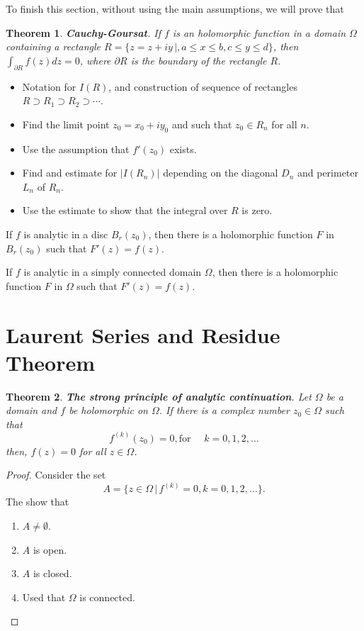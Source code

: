 \documentclass{amsart}
\newtheorem{thm}{Theorem}
\begin{document}
To finish this section, without using the main assumptions, we will prove that 

\begin{thm}
\textbf{Cauchy-Goursat}. If \(f\) is an holomorphic function in a domain \(\Omega\) containing a rectangle \(R = \{ z = z + iy \, | , a\leq x \leq b, c \leq y \leq d \}\), then \(\int_{\partial R} f(z) dz = 0\), where \(\partial R\) is the boundary of the rectangle \(R\).
\end{thm}

\begin{itemize}
\item Notation for \(I(R)\), and construction of sequence of rectangles \(R \supset R_1 \supset R_2 \supset \cdots\).
\item Find the limit point \(z_0 = x_0+ i y_0\) and such that \(z_0 \in R_{n}\) for all \(n\).
\item Use the assumption that \(f'(z_0)\) exists.
\item Find and estimate for \(|I(R_n)|\) depending on the diagonal \(D_n\) and perimeter \(L_n\) of \(R_n\).
\item Use the estimate to show that the integral over \(R\) is zero.
\end{itemize}

If \(f\) is analytic in a disc \(B_r(z_0)\), then there is a holomorphic function \(F\) in \(B_r(z_0)\) such that \(F'(z) = f(z)\).

If \(f\) is analytic in a simply connected domain \(\Omega\), then there is a holomorphic function \(F\) in \(\Omega\) such that \(F'(z) = f(z)\).



\section{Laurent Series and Residue Theorem}
\label{sec:org5c138fa}

\begin{thm}
\textbf{The strong principle of analytic continuation}. Let \(\Omega\) be a domain and \(f\) be holomorphic on \(\Omega\). If there is a complex number \(z_0\in\Omega\) such that
\[ f^{(k)}(z_0) = 0, \mbox{for }\quad k = 0,1,2,\ldots \]
then, \(f(z) = 0\) for all \(z\in \Omega\).
\end{thm}
\begin{proof}
Consider the set 
\[ A = \{ z \in \Omega \, | \, f^{(k)} = 0, k = 0,1,2,\ldots \}. \]
The show that
\begin{enumerate}
\item \(A \neq \emptyset\).
\item \(A\) is open.
\item \(A\) is closed.
\item Used that \(\Omega\) is connected.
\end{enumerate}
\end{proof}
\end{document}
